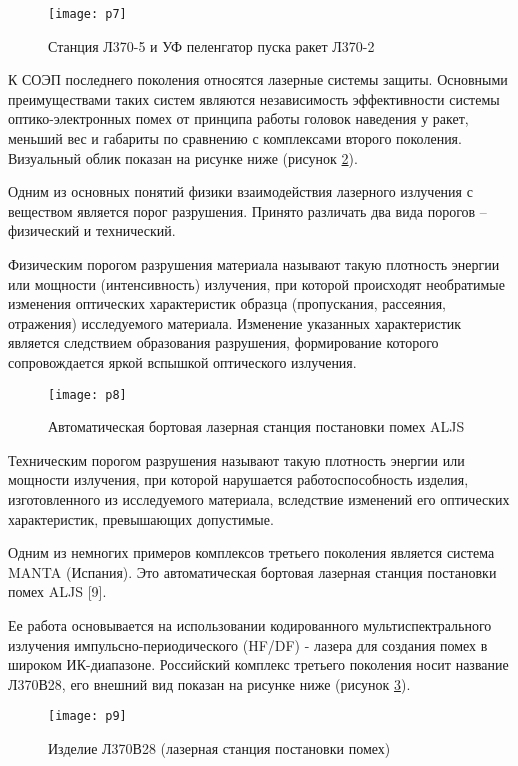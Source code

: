 \begin{figure}[ht]
	\texttt{[image: p7]} 
	\caption{Станция Л370-5 и УФ пеленгатор пуска ракет Л370-2}
	\label{fig:p7}
\end{figure}

К СОЭП последнего поколения относятся лазерные системы защиты. Основными преимуществами таких систем являются независимость эффективности системы оптико-электронных помех от принципа работы головок наведения у ракет, меньший вес и габариты по сравнению с комплексами второго поколения. Визуальный облик показан на рисунке ниже (рисунок \ref{fig:p8}).

Одним из основных понятий физики взаимодействия лазерного излучения с веществом является порог разрушения. Принято различать два вида порогов – физический и технический. 

Физическим порогом разрушения материала называют такую плотность энергии или мощности (интенсивность) излучения, при которой происходят необратимые изменения оптических характеристик образца (пропускания, рассеяния, отражения) исследуемого материала. Изменение указанных характеристик является следствием образования разрушения, формирование которого сопровождается яркой вспышкой оптического излучения. 

\begin{figure}[ht]
	\texttt{[image: p8]} 
	\caption{Автоматическая бортовая лазерная станция постановки помех ALJS}
	\label{fig:p8}
\end{figure}

Техническим порогом разрушения называют такую плотность энергии или мощности излучения, при которой нарушается работоспособность изделия, изготовленного из исследуемого материала, вследствие изменений его оптических характеристик, превышающих допустимые.

Одним из немногих примеров комплексов третьего поколения является система MANTA (Испания). Это автоматическая бортовая лазерная станция постановки помех ALJS [9].

Ее работа основывается на использовании кодированного мультиспектрального излучения импульсно-периодического (HF/DF) - лазера для создания помех в широком ИК-диапазоне.
Российский комплекс третьего поколения носит название Л370В28, его внешний вид показан на рисунке ниже (рисунок \ref{fig:p9}). 

\begin{figure}[ht]
	\texttt{[image: p9]} 
	\caption{Изделие Л370В28 (лазерная станция постановки помех)}
	\label{fig:p9}
\end{figure}

